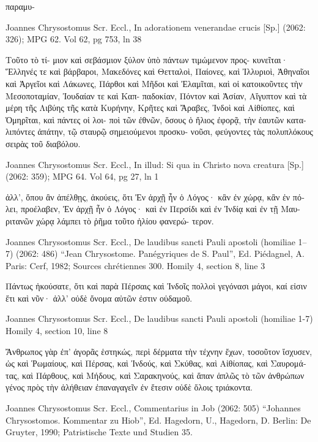 \documentclass[12pt,letterpaper,twoside,final]{memoir}
\begin{document}
\begin{greek}
παραμυ-





Joannes Chrysostomus Scr. Eccl., In adorationem venerandae crucis [Sp.] (2062: 326); MPG 62.
Vol 62, pg 753, ln 38

                                           Τοῦτο τὸ τί-
μιον καὶ σεβάσμιον ξύλον ὑπὸ πάντων τιμώμενον προς-
κυνεῖται· Ἕλληνές τε καὶ βάρβαροι, Μακεδόνες καὶ 
Θετταλοὶ, Παίονες, καὶ Ἰλλυριοὶ, Ἀθηναῖοι καὶ Ἀργεῖοι 
καὶ Λάκωνες, Πάρθοι καὶ Μῆδοι καὶ Ἐλαμῖται, καὶ οἱ 
κατοικοῦντες τὴν Μεσοποταμίαν, Ἰουδαίαν τε καὶ Καπ-
παδοκίαν, Πόντον καὶ Ἀσίαν, Αἴγυπτον καὶ τὰ μέρη τῆς 
Λιβύης τῆς κατὰ Κυρήνην, Κρῆτες καὶ Ἄραβες, 
Ἰνδοὶ καὶ Αἰθίοπες, καὶ Ὁμηρῖται, καὶ πάντες οἱ λοι-
ποὶ τῶν ἐθνῶν, ὅσους ὁ ἥλιος ἐφορᾷ, τὴν ἑαυτῶν κατα-
λιπόντες ἀπάτην, τῷ σταυρῷ σημειούμενοι προσκυ-
νοῦσι, φεύγοντες τὰς πολυπλόκους σειρὰς τοῦ διαβόλου. 



Joannes Chrysostomus Scr. Eccl., In illud: Si qua in Christo nova creatura [Sp.] (2062: 359); MPG 64.
Vol 64, pg 27, ln 1

                                                        ἀλλ', 
ὅπου ἂν ἀπέλθῃς, ἀκούεις, ὅτι Ἐν ἀρχῇ ἦν ὁ Λόγος· 
κἂν ἐν χώρᾳ, κἂν ἐν πόλει, προέλαβεν, Ἐν ἀρχῇ ἦν   
ὁ Λόγος· καὶ ἐν Περσίδι καὶ ἐν Ἰνδίᾳ καὶ ἐν τῇ Μαυ-
ριτανῶν χώρᾳ λάμπει τὸ ῥῆμα τοῦτο ἡλίου φανερώ-
τερον. 



Joannes Chrysostomus Scr. Eccl., De laudibus sancti Pauli apostoli (homiliae 1–7) (2062: 486)
“Jean Chrysostome. Panégyriques de S. Paul”, Ed. Piédagnel, A.
Paris: Cerf, 1982; Sources chrétiennes 300.
Homily 4, section 8, line 3

           Πάντως ἠκούσατε, ὅτι καὶ παρὰ Πέρσαις καὶ 
Ἰνδοῖς πολλοὶ γεγόνασι μάγοι, καί εἰσιν ἔτι καὶ νῦν· ἀλλ' 
οὐδὲ ὄνομα αὐτῶν ἐστιν οὐδαμοῦ. 



Joannes Chrysostomus Scr. Eccl., De laudibus sancti Pauli apostoli (homiliae 1-7) 
Homily 4, section 10, line 8

                                                 Ἄνθρωπος 
γὰρ ἐπ' ἀγορᾶς ἑστηκώς, περὶ δέρματα τὴν τέχνην ἔχων, 
τοσοῦτον ἴσχυσεν, ὡς καὶ Ῥωμαίους, καὶ Πέρσας, καὶ 
Ἰνδούς, καὶ Σκύθας, καὶ Αἰθίοπας, καὶ Σαυρομάτας, καὶ 
Πάρθους, καὶ Μήδους, καὶ Σαρακηνούς, καὶ ἅπαν ἁπλῶς 
τὸ τῶν ἀνθρώπων γένος πρὸς τὴν ἀλήθειαν ἐπαναγαγεῖν 
ἐν ἔτεσιν οὐδὲ ὅλοις τριάκοντα. 



Joannes Chrysostomus Scr. Eccl., Commentarius in Job (2062: 505)
“Johannes Chrysostomos. Kommentar zu Hiob”, Ed. Hagedorn, U., Hagedorn, D.
Berlin: De Gruyter, 1990; Patristische Texte und Studien 35.



\end{greek}
\end{document}
